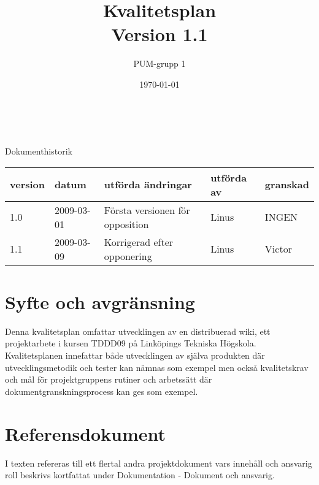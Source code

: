 

\ifpdf
\else
\fi

\title{Kvalitetsplan\\ Version 1.1}
\author{PUM-grupp 1}\\
\date{\today}



\maketitle\thispagestyle{empty}
\newpage

{\centering \Large{Dokumenthistorik\\}}

\vspace{10pt}
\begin{tabularx}{\textwidth}{ |l|l|X|l|l| }
  \hline
    \textbf{version} & \textbf{datum} & \textbf{utförda ändringar} & \textbf{utförda av} & \textbf{granskad} \\
	\hline 
  1.0 & 2009-03-01 & Första versionen för opposition & Linus & INGEN \\
  1.1 & 2009-03-09 & Korrigerad efter opponering & Linus & Victor \\
  \hline
\end{tabularx}

\newpage

\setcounter{tocdepth}{3}
\tableofcontents
\newpage

\section{Syfte och avgränsning}
Denna kvalitetsplan omfattar utvecklingen av en distribuerad wiki, ett projektarbete i kursen TDDD09 på Linköpings Tekniska Högskola. Kvalitetsplanen innefattar både utvecklingen av själva produkten där utvecklingsmetodik och tester kan nämnas som exempel men också kvalitetskrav och mål för projektgruppens rutiner och arbetssätt där dokumentgranskningsprocess kan ges som exempel. 

\section{Referensdokument}
I texten refereras till ett flertal andra projektdokument vars innehåll och ansvarig roll beskrivs kortfattat under Dokumentation - Dokument och ansvarig.

